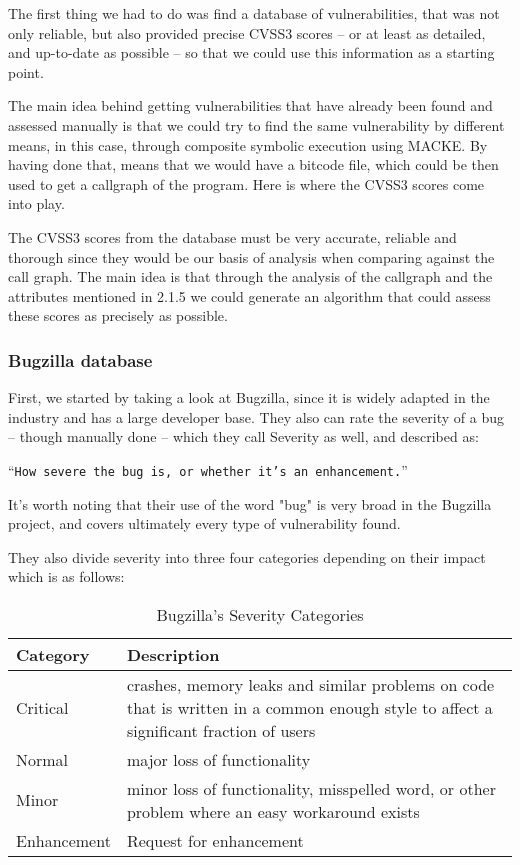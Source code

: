 The first thing we had to do was find a database of vulnerabilities, that was not only reliable, but also provided precise CVSS3 scores -- or at least as detailed, and up-to-date as possible -- so that we could use this information as a starting point.

The main idea behind getting vulnerabilities that have already been found and assessed manually is that we could try to find the same vulnerability by different means, in this case, through composite symbolic execution using MACKE. By having done that, means that we would have a bitcode file, which could be then used to get a callgraph of the program. Here is where the CVSS3 scores come into play.

The CVSS3 scores from the database must be very accurate, reliable and thorough since they would be our basis of analysis when comparing against the call graph. The main idea is that through the analysis of the callgraph and the attributes mentioned in 2.1.5 we could generate an algorithm that could assess these scores as precisely as possible.

\subsubsection{Bugzilla database}
First, we started by taking a look at Bugzilla\parencite{bugzilla}, since it is widely adapted in the industry and has a large developer base. They also can rate the severity of a bug -- though manually done -- which they call Severity as well, and described as:

\enquote{\texttt{How severe the bug is, or whether it's an enhancement.}}\parencite{bugzilla}

It's worth noting that their use of the word "bug" is very broad in the Bugzilla project, and covers ultimately every type of vulnerability found. 

They also divide severity into three four categories depending on their impact which is as follows:

\begin{table}[!htb]
	\centering
	\caption{Bugzilla's Severity Categories}
	\begin{tabular}{ |p{4cm}||p{9cm}|  }
		\hline
		Category & Description\\
		\hline
		Critical   & crashes, memory leaks and similar problems on code that is written in a common enough style to affect a significant fraction of users   \\
		Normal &   major loss of functionality \\
		Minor & minor loss of functionality, misspelled word, or other problem where an easy workaround exists \\
		Enhancement    & Request for enhancement \\
		\hline
	\end{tabular}
\end{table}

